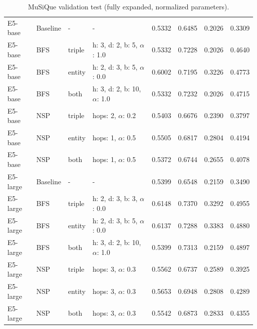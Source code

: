\documentclass[11pt]{article}
\begin{document}
\begin{table}[t]
\begin{tabular}{llllcccc}
E5-base & Baseline & - & - & 0.5332 & 0.6485 & 0.2026 & 0.3309 \\
E5-base & BFS & triple & h: 3, d: 2, b: 5, $\alpha$: 1.0 & 0.5332 & 0.7228 & 0.2026 & 0.4640 \\
E5-base & BFS & entity & h: 2, d: 3, b: 5, $\alpha$: 0.0 & 0.6002 & 0.7195 & 0.3226 & 0.4773 \\
E5-base & BFS & both & h: 3, d: 2, b: 10, $\alpha$: 1.0 & 0.5332 & 0.7232 & 0.2026 & 0.4715 \\
E5-base & NSP & triple & hops: 2, $\alpha$: 0.2 & 0.5403 & 0.6676 & 0.2390 & 0.3797 \\
E5-base & NSP & entity & hops: 1, $\alpha$: 0.5 & 0.5505 & 0.6817 & 0.2804 & 0.4194 \\
E5-base & NSP & both & hops: 1, $\alpha$: 0.5 & 0.5372 & 0.6744 & 0.2655 & 0.4078 \\

E5-large & Baseline & - & - & 0.5399 & 0.6548 & 0.2159 & 0.3490 \\
E5-large & BFS & triple & h: 2, d: 3, b: 3, $\alpha$: 0.0 & 0.6148 & 0.7370 & 0.3292 & 0.4955 \\
E5-large & BFS & entity & h: 2, d: 3, b: 5, $\alpha$: 0.0 & 0.6137 & 0.7288 & 0.3383 & 0.4880 \\
E5-large & BFS & both & h: 3, d: 2, b: 10, $\alpha$: 1.0 & 0.5399 & 0.7313 & 0.2159 & 0.4897 \\
E5-large & NSP & triple & hops: 3, $\alpha$: 0.3 & 0.5562 & 0.6737 & 0.2589 & 0.3925 \\
E5-large & NSP & entity & hops: 3, $\alpha$: 0.3 & 0.5653 & 0.6948 & 0.2808 & 0.4289 \\
E5-large & NSP & both & hops: 3, $\alpha$: 0.3 & 0.5542 & 0.6873 & 0.2833 & 0.4355 \\

\bottomrule
\end{tabular}
\caption{MuSiQue validation test (fully expanded, normalized parameters).}
\label{tab:Mu}

\end{table}

\newpage
\end{document}
